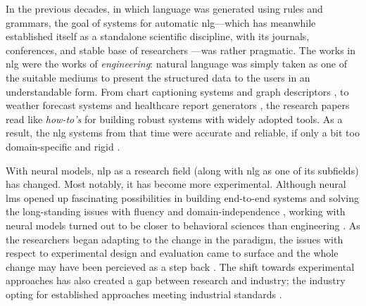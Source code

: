 In the previous decades, in which language was generated using rules and grammars, the goal of systems for automatic \ac{nlg}---which has meanwhile established itself as a standalone scientific discipline, with its journals, conferences, and stable base of researchers \cite{ACLanthologySIGGEN}---was rather pragmatic.
The works in \ac{nlg} were the works of \emph{engineering}: natural language was simply taken as one of the suitable mediums to present the structured data to the users in an understandable form. From chart captioning systems \cite{mittalDescribingComplexCharts1998} and graph descriptors \cite{sunDomainIndependentSentence2006}, to weather forecast systems \cite{belzAutomaticGenerationWeather2008} and healthcare report generators \cite{portetAutomaticGenerationTextual2009}, the research papers read like \emph{how-to's} for building robust systems with widely adopted tools. As a result, the \ac{nlg} systems from that time were accurate and reliable, if only a bit too domain-specific and rigid \cite{reiterBuildingAppliedNatural1997,gattSurveyStateArt2018}.


With neural models, \ac{nlp} as a research field (along with \ac{nlg} as one of its subfields) has changed. Most notably, it has become more experimental. Although neural \acp{lm} opened up fascinating possibilities in building end-to-end systems and solving the long-standing issues with fluency and domain-independence \cite{ferreiraNeuralDatatotextGeneration2019,dusekEvaluatingStateoftheartEndtoEnd2020,sharmaInnovationsNeuralDatatotext2022}, working with neural models turned out to be closer to behavioral sciences than engineering \cite{holtzmanGenerativeModelsComplex2023}. As the researchers began adapting to the change in the paradigm, the issues with respect to experimental design and evaluation came to surface \cite{gehrmannRepairingCrackedFoundation2022} and the whole change may have been percieved as a step back \cite{reiter2020academic}. The shift towards experimental approaches has also created a gap between research and industry; the industry opting for established approaches meeting industrial standards
\cite{daleNaturalLanguageGeneration2020,daleNavigatingTextGeneration2023}.


